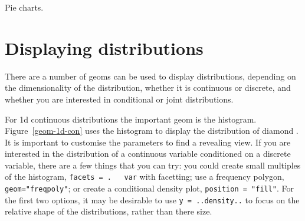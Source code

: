 % 


Pie charts.

\section{Displaying distributions}\label{sec:distributions}

There are a number of geoms can be used to display distributions, depending on the dimensionality of the distribution, whether it is continuous or discrete, and whether you are interested in conditional or joint distributions.  

For 1d continuous distributions the important geom is the histogram.  Figure~\ref{geom-1d-con} uses the histogram to display the distribution of diamond .  It is important to customise the parameters to find a revealing view.  If you are interested in the distribution of a continuous variable conditioned on a discrete variable, there are a few things that you can try: you could create small multiples of the histogram, {\tt facets = . ~ var} with facetting; use a frequency polygon, {\tt geom="freqpoly"}; or create a conditional density plot, {\tt position = "fill"}.  For the first two options, it may be desirable to use {\tt y = ..density..} to focus on the relative shape of the distributions, rather than there size. 

% 


